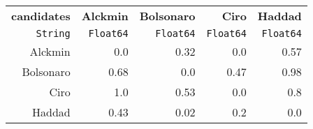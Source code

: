 \begin{table}
  \begin{tabular}{rrrrr}
    \hline\hline
    \textbf{candidates} & \textbf{Alckmin} & \textbf{Bolsonaro} & \textbf{Ciro} & \textbf{Haddad} \\
    \texttt{String} & \texttt{Float64} & \texttt{Float64} & \texttt{Float64} & \texttt{Float64} \\\hline
    Alckmin & 0.0 & 0.32 & 0.0 & 0.57 \\
    Bolsonaro & 0.68 & 0.0 & 0.47 & 0.98 \\
    Ciro & 1.0 & 0.53 & 0.0 & 0.8 \\
    Haddad & 0.43 & 0.02 & 0.2 & 0.0 \\\hline\hline
  \end{tabular}
\end{table}

